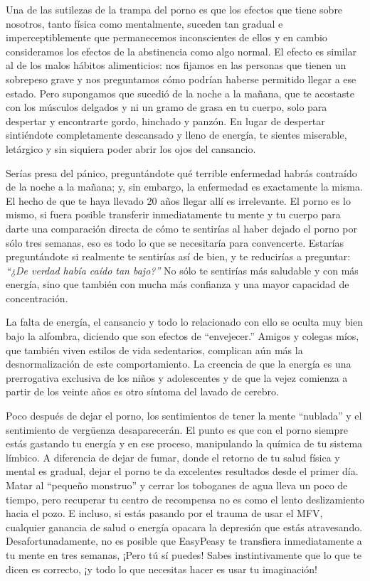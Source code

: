 \documentclass[
  spanish,
  openany]{book}
\begin{document}
Una de las sutilezas de la trampa del porno es que los efectos que tiene sobre nosotros, tanto física como mentalmente, suceden tan gradual e imperceptiblemente que permanecemos inconscientes de ellos y en cambio consideramos los efectos de la abstinencia como algo normal. El efecto es similar al de los malos hábitos alimenticios: nos fijamos en las personas que tienen un sobrepeso grave y nos preguntamos cómo podrían haberse permitido llegar a ese estado. Pero supongamos que sucedió de la noche a la mañana, que te acostaste con los músculos delgados y ni un gramo de grasa en tu cuerpo, solo para despertar y encontrarte gordo, hinchado y panzón. En lugar de despertar sintiéndote completamente descansado y lleno de energía, te sientes miserable, letárgico y sin siquiera poder abrir los ojos del cansancio.

Serías presa del pánico, preguntándote qué terrible enfermedad habrás contraído de la noche a la mañana; y, sin embargo, la enfermedad es exactamente la misma. El hecho de que te haya llevado 20 años llegar allí es irrelevante. El porno es lo mismo, si fuera posible transferir inmediatamente tu mente y tu cuerpo para darte una comparación directa de cómo te sentirías al haber dejado el porno por sólo tres semanas, eso es todo lo que se necesitaría para convencerte. Estarías preguntándote si realmente te sentirías así de bien, y te reducirías a preguntar: \emph{``¿De verdad había caído tan bajo?''} No sólo te sentirías más saludable y con más energía, sino que también con mucha más confianza y una mayor capacidad de concentración.

La falta de energía, el cansancio y todo lo relacionado con ello se oculta muy bien bajo la alfombra, diciendo que son efectos de ``envejecer.'' Amigos y colegas míos, que también viven estilos de vida sedentarios, complican aún más la desnormalización de este comportamiento. La creencia de que la energía es una prerrogativa exclusiva de los niños y adolescentes y de que la vejez comienza a partir de los veinte años es otro síntoma del lavado de cerebro.

Poco después de dejar el porno, los sentimientos de tener la mente ``nublada'' y el sentimiento de vergüenza desaparecerán. El punto es que con el porno siempre estás gastando tu energía y en ese proceso, manipulando la química de tu sistema límbico. A diferencia de dejar de fumar, donde el retorno de tu salud física y mental es gradual, dejar el porno te da excelentes resultados desde el primer día. Matar al ``pequeño monstruo'' y cerrar los toboganes de agua lleva un poco de tiempo, pero recuperar tu centro de recompensa no es como el lento deslizamiento hacia el pozo. E incluso, si estás pasando por el trauma de usar el MFV, cualquier ganancia de salud o energía opacara la depresión que estás atravesando. Desafortunadamente, no es posible que EasyPeasy te transfiera inmediatamente a tu mente en tres semanas, ¡Pero tú sí puedes! Sabes instintivamente que lo que te dicen es correcto, ¡y todo lo que necesitas hacer es usar tu imaginación!
\end{document}
